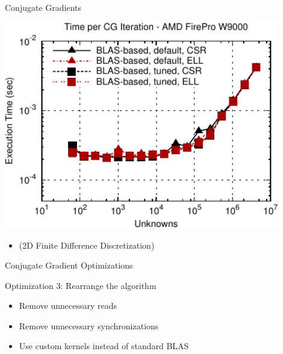 \begin{frame}[fragile]{Conjugate Gradients}
 \begin{block}{}
 \begin{center}
  \vspace*{-0.5cm}
  \includegraphics[width=0.9\textwidth]{figures/cg-firepro-w9000-2}
 \end{center}

 \begin{itemize}
  \item   \vspace*{-0.3cm} {\small (2D Finite Difference Discretization)}
 \end{itemize}
 \end{block}   
\end{frame}



\begin{frame}[fragile]{Conjugate Gradient Optimizations}

 \begin{block}{Optimization 3: Rearrange the algorithm}
   \begin{itemize}
   \item  Remove unnecessary reads 
   \item  Remove unnecessary synchronizations
   \item Use custom kernels instead of standard BLAS
  \end{itemize}
 \end{block}
   
\end{frame}


